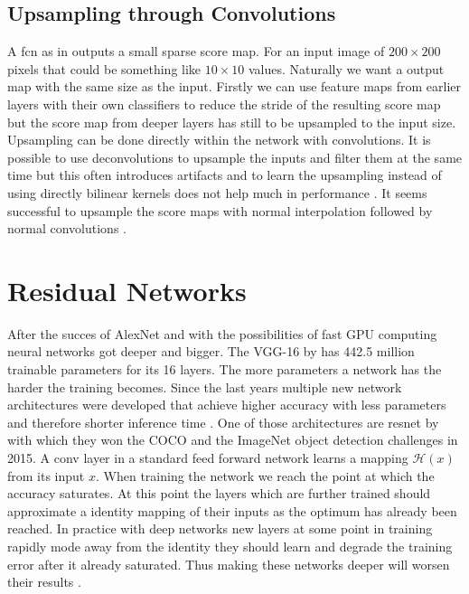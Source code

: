 \subsection{Upsampling through Convolutions}
\label{sub:concepts:fcn:upsampling}
A \gls{fcn} as in \citep{long_fully_2015} outputs a small sparse score map. For an input image of $200\times 200$ pixels that could be something like $10\times 10$ values. Naturally we want a output map with the same size as the input. Firstly we can use feature maps from earlier layers with their own classifiers to reduce the stride of the resulting score map but the score map from deeper layers has still to be upsampled to the input size. Upsampling can be done directly within the network with convolutions. It is possible to use deconvolutions to upsample the inputs and filter them at the same time but this often introduces artifacts \citep{odena_deconvolution_2016} and to learn the upsampling instead of using directly bilinear kernels does not help much in performance \citep{shelhamer_fully_2016}. It seems successful to upsample the score maps with normal interpolation followed by normal convolutions \citep{dong_image_2016}.

\section{Residual Networks}
\label{sec:concepts:resnet}
After the succes of AlexNet \citep{krizhevsky_imagenet_2012} and with the possibilities of fast GPU computing neural networks got deeper and bigger.
The VGG-16 by \citet{simonyan_very_2014} has 442.5 million trainable parameters for its 16 layers. The more parameters a network has the harder the training becomes.
Since the last years multiple new network architectures were developed that achieve higher accuracy with less parameters and therefore shorter inference time \citep{canziani_analysis_2016}. One of those architectures are \gls{resnet} by \citet{he_deep_2016} with which they won the COCO  \citet{lin_microsoft_2014} and the ImageNet \citet{russakovsky_imagenet_2015} object detection challenges in 2015.
A \gls{conv} layer in a standard feed forward network learns a mapping $\mathcal{H}(x)$ from its input $x$. When training the network we reach the point at which the accuracy saturates. At this point the layers which are further trained should approximate a identity mapping of their inputs as the optimum has already been reached. In practice with deep networks new layers at some point in training rapidly mode away from the identity they should learn and degrade the training error after it already saturated. Thus making these networks deeper will worsen their results \citep{he_convolutional_2015}.


